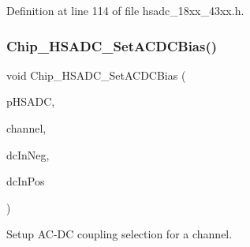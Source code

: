 Definition at line 114 of file hsadc\+\_\+18xx\+\_\+43xx.\+h.

\mbox{\label{group___h_s_a_d_c__18_x_x__43_x_x_gaf754b858ff1c0c0d2993aaedad394867}} 
\subsubsection{\texorpdfstring{Chip\+\_\+\+H\+S\+A\+D\+C\+\_\+\+Set\+A\+C\+D\+C\+Bias()}{Chip\_HSADC\_SetACDCBias()}}
{\footnotesize\ttfamily void Chip\+\_\+\+H\+S\+A\+D\+C\+\_\+\+Set\+A\+C\+D\+C\+Bias (\begin{DoxyParamCaption}\item[{\hyperlink{struct_l_p_c___h_s_a_d_c___t}{L\+P\+C\+\_\+\+H\+S\+A\+D\+C\+\_\+T} $\ast$}]{p\+H\+S\+A\+DC,  }\item[{uint8\+\_\+t}]{channel,  }\item[{\hyperlink{group___h_s_a_d_c__18_x_x__43_x_x_ga1769145f3b2f1c12f4cd23d3b5151e93}{H\+S\+A\+D\+C\+\_\+\+D\+C\+B\+I\+A\+S\+\_\+T}}]{dc\+In\+Neg,  }\item[{\hyperlink{group___h_s_a_d_c__18_x_x__43_x_x_ga1769145f3b2f1c12f4cd23d3b5151e93}{H\+S\+A\+D\+C\+\_\+\+D\+C\+B\+I\+A\+S\+\_\+T}}]{dc\+In\+Pos }\end{DoxyParamCaption})}



Setup A\+C-\/\+DC coupling selection for a channel. 


